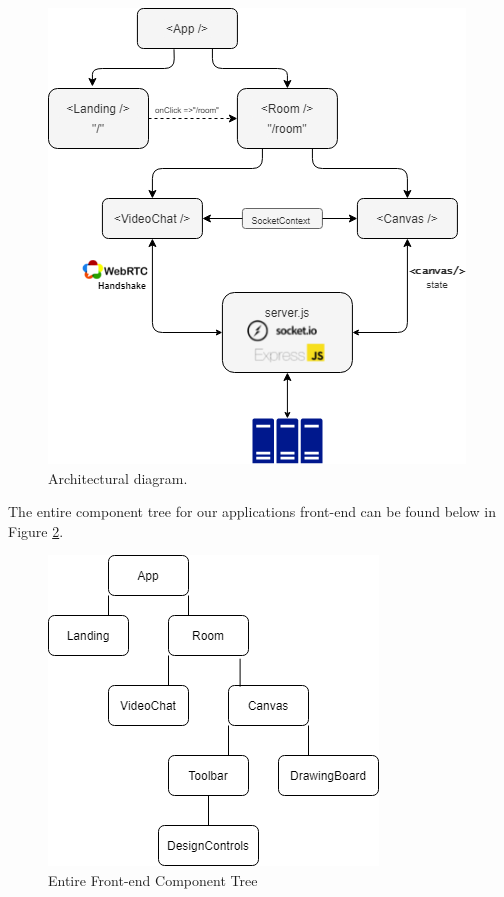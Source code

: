 \begin{figure}[H]
    \centering
    \includegraphics[scale=0.8]{img/SystemDesign/full-architecture.png}
    \caption{Architectural diagram.}
    \label{architecuralDiagram}
\end{figure}

The entire component tree for our applications front-end can be found below in Figure \ref{full-comp-tree}.

\begin{figure}[H]
    \centering
    \includegraphics[scale=0.7]{img/SystemDesign/full-component-tree.png}
    \caption{Entire Front-end Component Tree}
    \label{full-comp-tree}
\end{figure}

